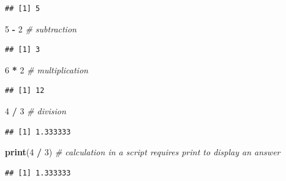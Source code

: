 \documentclass[]{book}
\newenvironment{Shaded}{\begin{snugshade}}{\end{snugshade}}
\newcommand{\KeywordTok}[1]{\textcolor[rgb]{0.13,0.29,0.53}{\textbf{#1}}}
\newcommand{\DecValTok}[1]{\textcolor[rgb]{0.00,0.00,0.81}{#1}}
\newcommand{\StringTok}[1]{\textcolor[rgb]{0.31,0.60,0.02}{#1}}
\newcommand{\CommentTok}[1]{\textcolor[rgb]{0.56,0.35,0.01}{\textit{#1}}}
\newcommand{\OperatorTok}[1]{\textcolor[rgb]{0.81,0.36,0.00}{\textbf{#1}}}
\newcommand{\NormalTok}[1]{#1}
\theoremstyle{definition}
\theoremstyle{definition}
\theoremstyle{definition}
\theoremstyle{remark}
\begin{document}
\begin{verbatim}
## [1] 5
\end{verbatim}

\begin{Shaded}
\begin{Highlighting}[]
\DecValTok{5} \OperatorTok{-}\StringTok{ }\DecValTok{2}           \CommentTok{# subtraction}
\end{Highlighting}
\end{Shaded}

\begin{verbatim}
## [1] 3
\end{verbatim}

\begin{Shaded}
\begin{Highlighting}[]
\DecValTok{6} \OperatorTok{*}\StringTok{ }\DecValTok{2}           \CommentTok{# multiplication}
\end{Highlighting}
\end{Shaded}

\begin{verbatim}
## [1] 12
\end{verbatim}

\begin{Shaded}
\begin{Highlighting}[]
\DecValTok{4} \OperatorTok{/}\StringTok{ }\DecValTok{3}           \CommentTok{# division}
\end{Highlighting}
\end{Shaded}

\begin{verbatim}
## [1] 1.333333
\end{verbatim}

\begin{Shaded}
\begin{Highlighting}[]
\KeywordTok{print}\NormalTok{(}\DecValTok{4} \OperatorTok{/}\StringTok{ }\DecValTok{3}\NormalTok{)    }\CommentTok{# calculation in a script requires print to display an answer}
\end{Highlighting}
\end{Shaded}

\begin{verbatim}
## [1] 1.333333
\end{verbatim}
\end{document}
